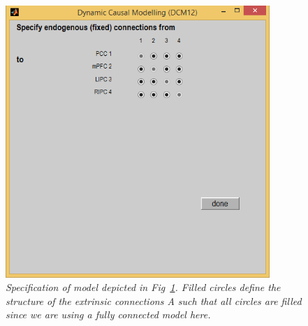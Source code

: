 \begin{figure}
\begin{center}
\includegraphics[width=100mm]{dcm_rs/Fig1}
\caption{\em Specification of model depicted in Fig~\ref{spdcm_Fig1}. Filled circles define the structure of the extrinsic connections A such that all circles are filled since we are using a fully connected model here.
\label{spdcm_Fig1}}
\end{center}
\end{figure}

